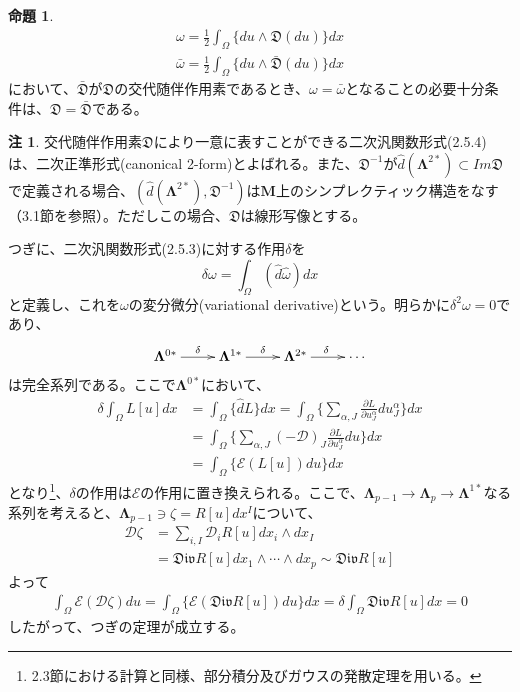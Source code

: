 \documentclass[a4paper, 11pt]{report}
\theoremstyle{definition}
\newtheorem{proposition}{命題}[section]
\newtheorem*{remark*}{注}
\begin{document}
\begin{proposition}
\begin{align*}
\omega = \frac{1}{2}\int_\Omega \{ du\wedge \mathfrak{D}(du) \} dx \\
\bar{\omega} = \frac{1}{2}\int_\Omega \{ du\wedge \bar{\mathfrak{D}}(du) \} dx
\end{align*}
において、$\bar{\mathfrak{D}}$が$\mathfrak{D}$の交代随伴作用素であるとき、$\omega=\bar{\omega}$となることの必要十分条件は、$\mathfrak{D}=\bar{\mathfrak{D}}$である。
\end{proposition}

\begin{remark*}
 交代随伴作用素$\mathfrak{D}$により一意に表すことができる二次汎関数形式(2.5.4)は、二次正準形式(canonical 2-form)とよばれる。また、$\mathfrak{D}^{-1}$が$\hat{d}(\mathbf{\Lambda}^{2*})\subset Im\mathfrak{D}$で定義される場合、$(\hat{d}(\mathbf{\Lambda}^{2*}), \mathfrak{D}^{-1})$は$\mathbf{M}$上のシンプレクティック構造をなす（3.1節を参照）。ただしこの場合、$\mathfrak{D}$は線形写像とする。
\end{remark*}

 つぎに、二次汎関数形式(2.5.3)に対する作用$\delta$を
\begin{equation*}
\delta \omega = \int_\Omega (\hat{d} \hat{\omega})dx
\end{equation*}
と定義し、これを$\omega$の変分微分(variational derivative)という。明らかに$\delta^2 \omega=0$であり、
\begin{align*}
\xymatrix{
\mathbf{\Lambda}^{0*} \ar[r]^{\delta} &\mathbf{\Lambda}^{1*} \ar[r]^{\delta} &\mathbf{\Lambda}^{2*} \ar[r]^{\delta} &{\cdots}
}
\end{align*}
は完全系列である。ここで$\mathbf{\Lambda}^{0*}$において、
\begin{align}
\delta \int_\Omega L[u]dx &= \int_\Omega \{ \hat{d}L \} dx = \int_\Omega \{ \sum _{\alpha,J} \frac{\partial L}{\partial u^\alpha_J} du^\alpha_J \} dx \nonumber\\
&= \int_\Omega \{ \sum _{\alpha,J} (-\mathcal{D})_J \frac{\partial L}{\partial u^\alpha_J} du \} dx \nonumber\\
&= \int_\Omega \{ \mathcal{E}(L[u]) du \} dx %
\end{align}
となり\footnote{2.3節における計算と同様、部分積分及びガウスの発散定理を用いる。}、$\delta$の作用は$\mathcal{E}$の作用に置き換えられる。ここで、$\mathbf{\Lambda}_{p-1}\xrightarrow{}\mathbf{\Lambda}_{p}\xrightarrow{}\mathbf{\Lambda}^{1*}$なる系列を考えると、$\mathbf{\Lambda}_{p-1}\ni \zeta=R[u]dx^I$について、
\begin{align*}
\mathcal{D}\zeta &= \sum_{i,I}\mathcal{D}_iR[u] dx_i\wedge dx_I\\
&= \mathfrak{Div}R[u]dx_1\wedge\cdots\wedge dx_p \sim \mathfrak{Div}R[u]
\end{align*}
よって
\begin{align*}
\int_\Omega \mathcal{E}(\mathcal{D}\zeta)du = \int_\Omega \{ \mathcal{E}(\mathfrak{Div}R[u])du \} dx = \delta \int_\Omega \mathfrak{Div}R[u] dx = 0
\end{align*}
したがって、つぎの定理が成立する。
\end{document}
